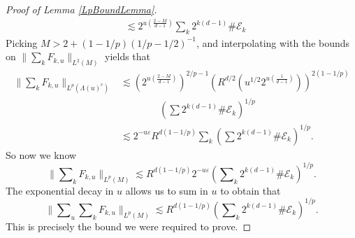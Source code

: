 \begin{proof}[Proof of Lemma \ref{LpBoundLemma}]
\begin{equation}
\begin{split}
    &\lesssim 2^{u \left( \frac{2-M}{d-1} \right)} \sum\nolimits_k 2^{k (d-1)} \# \mathcal{E}_k
\end{split}
\end{equation}
%
Picking $M > 2 + (1 - 1/p)(1/p - 1/2)^{-1}$, and interpolating with the bounds on $\| \sum_k F_{k,u} \|_{L^2(M)}$ yields that
%
\begin{equation}
\begin{split}
    \Big\| \sum\nolimits_k F_{k,u} \Big\|_{L^p(\Lambda(u)^c)} &\lesssim \left( 2^{u \left( \frac{2-M}{d-1} \right)} \right)^{2/p - 1} \left( R^{d/2} \left( u^{1/2} 2^{u \left( \frac{1}{d-1} \right)} \right) \right)^{2(1 - 1/p)}\\
    &\quad\quad\quad\quad \left( \sum 2^{k(d-1)} \# \mathcal{E}_k \right)^{1/p} \\
    &\lesssim 2^{-u \varepsilon} R^{d(1 - 1/p)} \sum\nolimits_k \left( \sum 2^{k(d-1)} \# \mathcal{E}_k \right)^{1/p}.
\end{split}
\end{equation}
%
So now we know
%
\begin{equation}
    \Big\| \sum\nolimits_k F_{k,u} \Big\|_{L^p(M)} \lesssim R^{d(1-1/p)} 2^{- u \varepsilon} \left( \sum\nolimits_k 2^{k(d-1)} \# \mathcal{E}_k \right)^{1/p}.
\end{equation}
%
The exponential decay in $u$ allows us to sum in $u$ to obtain that
%
\begin{equation}
    \Big\| \sum\nolimits_u \sum\nolimits_k F_{k,u} \Big\|_{L^p(M)} \lesssim R^{d(1 - 1/p)} \left( \sum\nolimits_k 2^{k(d-1)} \# \mathcal{E}_k \right)^{1/p}.
\end{equation}
%
This is precisely the bound we were required to prove.
\end{proof}



